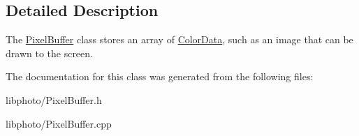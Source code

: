 \subsection{Detailed Description}
The \hyperlink{classPixelBuffer}{Pixel\-Buffer} class stores an array of \hyperlink{classColorData}{Color\-Data}, such as an image that can be drawn to the screen. 

The documentation for this class was generated from the following files\-:\begin{DoxyCompactItemize}
\item 
libphoto/Pixel\-Buffer.\-h\item 
libphoto/Pixel\-Buffer.\-cpp\end{DoxyCompactItemize}
